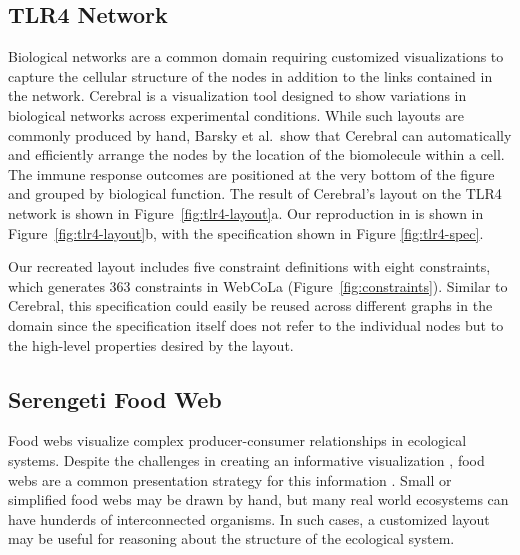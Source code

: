 \subsection{TLR4 Network}
Biological networks are a common domain requiring customized visualizations
to capture the cellular structure of the nodes in addition to the links
contained in the network. Cerebral \cite{barsky2008cerebral} is a visualization
tool designed to show variations in biological networks across experimental
conditions. While such layouts are commonly produced by hand, Barsky et al.\ show that 
Cerebral can automatically and efficiently arrange the nodes by the location
of the biomolecule within a cell. The immune response outcomes are positioned
at the very bottom of the figure and grouped by biological function. The result
of Cerebral's layout on the TLR4 network is shown in Figure~\ref{fig:tlr4-layout}a.
Our reproduction in \projectname is shown in Figure~\ref{fig:tlr4-layout}b,
with the specification shown in Figure \ref{fig:tlr4-spec}.

Our recreated layout includes five constraint definitions with eight \projectname
constraints, which generates $363$ constraints in WebCoLa (Figure~\ref{fig:constraints}).
Similar to Cerebral, this \projectname specification could easily be reused 
across different graphs in the domain since the specification itself does
not refer to the individual nodes but to the high-level properties desired
by the layout.

\subsection{Serengeti Food Web}
\krugerLayout
\serengetiLayout
\serengetiSpec

Food webs visualize complex producer-consumer relationships in ecological
systems. Despite the challenges in creating an informative
visualization \cite{kearney2016blog}, food webs are a common presentation strategy for this information
\cite{hinke2004visualizing,harper2006dynamic,lavigne1996cod,baskerville2011spatial,yodzis1998local,cohen2003ecological,benson2016higher,kruger2017}. Small or simplified food webs may be
drawn by hand, but many real world ecosystems can have hunderds of
interconnected organisms. In such cases, a customized layout may be useful
for reasoning about the structure of the ecological system.

